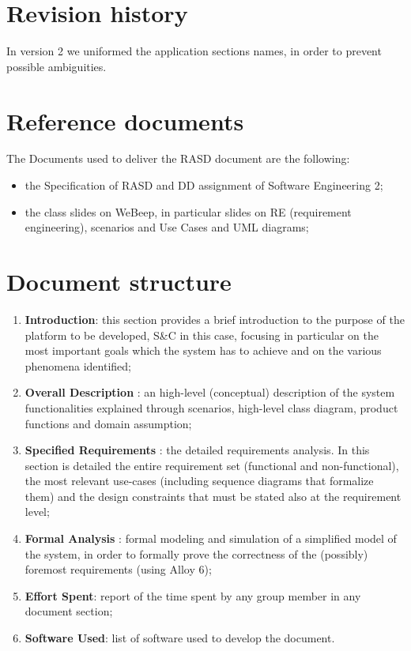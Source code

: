 	\section{Revision history}
		\begin{center}
		\end{center}
		
		In version 2 we uniformed the application sections names, in order to prevent possible ambiguities.
	\section{Reference documents}
		The Documents used to deliver the RASD document are the following:
		\begin{itemize}
			\item the Specification of RASD and DD assignment of Software Engineering 2;
			\item the class slides on WeBeep, in particular slides on RE (requirement engineering), scenarios and Use Cases and UML diagrams;
		\end{itemize}
	\section{Document structure}
		\begin{enumerate}
			\item \textbf{Introduction}: this section provides a brief introduction to the purpose of the platform to be developed, S\&C in this case, focusing in particular on the most important goals which the system has to achieve and on the various phenomena identified;
			\item \textbf{Overall Description} : an high-level (conceptual) description of the system functionalities explained through scenarios, high-level class diagram, product functions and domain assumption;
			\item \textbf{Specified Requirements} : the detailed requirements analysis. In this section is detailed the entire requirement set (functional and non-functional), the most relevant use-cases (including sequence diagrams that formalize them) and the design constraints that must be stated also at the requirement level;
			\item \textbf{Formal Analysis} : formal modeling and simulation of a simplified model of the system, in order to formally prove the correctness of the (possibly) foremost requirements (using Alloy 6);
			\item \textbf{Effort Spent}: report of the time spent by any group member in any document section;
			\item \textbf{Software Used}: list of software used to develop the document.
		\end{enumerate}
